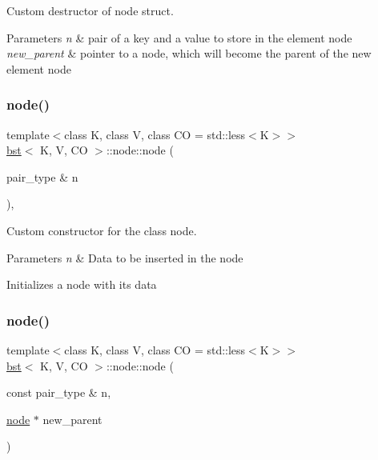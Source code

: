 Custom destructor of node struct. 


\begin{DoxyParams}{Parameters}
{\em n} & pair of a key and a value to store in the element node \\
\hline
{\em new\+\_\+parent} & pointer to a node, which will become the parent of the new element node \\
\hline
\end{DoxyParams}
\mbox{\label{structbst_1_1node_a1e7240e88331831393a987e30e09f69b}} 
\subsubsection{\texorpdfstring{node()}{node()}\hspace{0.1cm}{\footnotesize\ttfamily [3/5]}}
{\footnotesize\ttfamily template$<$class K, class V, class CO = std\+::less$<$\+K$>$$>$ \\
\hyperlink{classbst}{bst}$<$ K, V, CO $>$\+::node\+::node (\begin{DoxyParamCaption}\item[{pair\+\_\+type \&}]{n }\end{DoxyParamCaption})\hspace{0.3cm}{\ttfamily [inline]}, {\ttfamily [explicit]}}



Custom constructor for the class node. 


\begin{DoxyParams}{Parameters}
{\em n} & Data to be inserted in the node\\
\hline
\end{DoxyParams}
Initializes a node with its data \mbox{\label{structbst_1_1node_abd29bdf9f83aedca2dd04264d61624d4}} 
\subsubsection{\texorpdfstring{node()}{node()}\hspace{0.1cm}{\footnotesize\ttfamily [4/5]}}
{\footnotesize\ttfamily template$<$class K, class V, class CO = std\+::less$<$\+K$>$$>$ \\
\hyperlink{classbst}{bst}$<$ K, V, CO $>$\+::node\+::node (\begin{DoxyParamCaption}\item[{const pair\+\_\+type \&}]{n,  }\item[{\hyperlink{structbst_1_1node}{node} $\ast$}]{new\+\_\+parent }\end{DoxyParamCaption})\hspace{0.3cm}{\ttfamily [inline]}}



